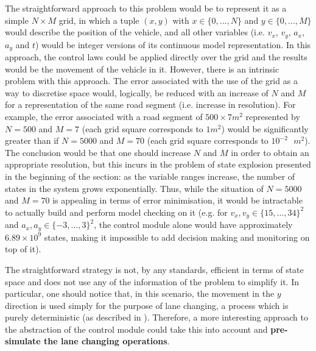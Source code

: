 The straightforward approach to this problem would be to represent it as a simple $N\times M$ grid, in which a tuple $(x,y)$ with $x\in \{0,...,N\}$ and $y\in \{0,...,M\}$ would describe the position of the vehicle, and all other variables (i.e. $v_x$, $v_y$, $a_x$, $a_y$ and $t$) would be integer versions of its continuous model representation. In this approach, the control laws could be applied directly over the grid and the results would be the movement of the vehicle in it. However, there is an intrinsic problem with this approach. The error associated with the use of the grid as a way to discretise space would, logically, be reduced with an increase of $N$ and $M$ for a representation of the same road segment (i.e. increase in resolution). For example, the error associated with a road segment of $500 \times 7m^2$ represented by $N = 500$ and $M = 7$ (each grid square corresponds to $1m^2$) would be significantly greater than if $N = 5000$ and $M = 70$ (each grid square corresponds to  $10^{-2}\text{ }m^2$). The conclusion would be that one should increase $N$ and $M$ in order to obtain an appropriate resolution, but this incurs in the problem of state explosion presented in the beginning of the section: as the variable ranges increase, the number of states in the system grows exponentially. Thus, while the situation of $N = 5000$ and $M = 70$ is appealing in terms of error minimisation, it would be intractable to actually build and perform model checking on it (e.g. for $v_x, v_y \in \{15,...,34\}^2$ and $a_x, a_y \in \{-3,...,3\}^2$, the control module alone would have approximately $6.89\times 10^{9}$ states, making it impossible to add decision making and monitoring on top of it). 

The straightforward strategy is not, by any standards, efficient in terms of state space and does not use any of the information of the problem to simplify it. In particular, one should notice that, in this scenario, the movement in the $y$ direction is used simply for the purpose of lane changing, a process which is purely deterministic (as described in \cite{salvucci_1}). Therefore, a more interesting approach to the abstraction of the control module could take this into account and \textbf{pre-simulate the lane changing operations}.

